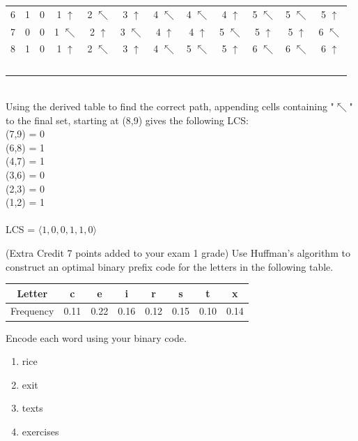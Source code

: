 \documentclass[addpoints,11pt]{exam}
\begin{document}
\begin{questions}
\begin{solutionorbox}
\begin{tabular}{c c | c | c | c | c | c | c | c | c | c | c |}
				\multirow{1}{*}{6} &
				1 & 0 & 1 $\uparrow$ & 2 $\nwarrow$ & 3 $\uparrow$ & 4 $\nwarrow$ & 4 $\nwarrow$ & 4 $\uparrow$ & 5 $\nwarrow$ & 5 $\nwarrow$ & 5 $\uparrow$\\\cline{3-12}
				\multirow{1}{*}{7} &
				0 & 0 & 1 $\nwarrow$ & 2 $\uparrow$ & 3 $\nwarrow$ & 4 $\uparrow$ & 4 $\uparrow$ & 5 $\nwarrow$ & 5 $\uparrow$ & 5 $\uparrow$ & 6 $\nwarrow$\\\cline{3-12}
				\multirow{1}{*}{8} &
				1 & 0 & 1 $\uparrow$ & 2 $\nwarrow$ & 3 $\uparrow$ & 4 $\nwarrow$ & 5 $\nwarrow$ & 5 $\uparrow$ & 6 $\nwarrow$ & 6 $\nwarrow$ & 6 $\uparrow$ \\\cline{3-12}\
			\end{tabular} \\
			Using the derived table to find the correct path, appending cells containing "$\nwarrow$" to the final set, starting at (8,9) gives the following LCS: \\
			(7,9) = 0 \\
			(6,8) = 1 \\
			(4,7) = 1 \\
			(3,6) = 0 \\
			(2,3) = 0 \\
			(1,2) = 1 \\ \\
			LCS = $\langle 1,0,0,1,1,0 \rangle$
			
			
		\end{solutionorbox}
		
		\ifprintanswers
		\newpage
		\else
		\bigskip
		\fi
		
		
		\question (Extra Credit 7 points added to your exam 1 grade)
		Use Huffman's algorithm to construct an optimal binary prefix code for the letters in the following table.
		
		\begin{tabular}{|c|c|c|c|c|c|c|c|}
			\hline
			Letter    & c    & e    & i    & r    & s    & t    & x    \\ \hline
			Frequency & 0.11 & 0.22 & 0.16 & 0.12 & 0.15 & 0.10 & 0.14 \\ \hline
		\end{tabular}
		
		Encode each word using your binary code.
		\begin{enumerate}
			\item rice
			\item exit
			\item texts
			\item exercises
		\end{enumerate}
		

\end{questions}
\end{document}
